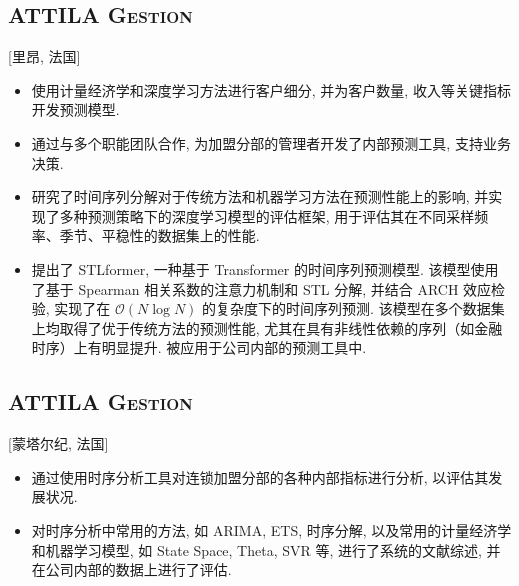 \documentclass{mycv}
\begin{document}
\vspace{-\parskip}

\subsection{\large \scshape ATTILA Gestion}[里昂, 法国]

\begin{positions}
\end{positions}

\begin{itemize}
  \itemsep 0em
  \item 使用计量经济学和深度学习方法进行客户细分, 并为客户数量, 收入等关键指标开发预测模型.
  \item 通过与多个职能团队合作, 为加盟分部的管理者开发了内部预测工具, 支持业务决策.
  \item 研究了时间序列分解对于传统方法和机器学习方法在预测性能上的影响, 并实现了多种预测策略下的深度学习模型的评估框架, 用于评估其在不同采样频率、季节、平稳性的数据集上的性能.
  \item 提出了 STLformer, 一种基于 Transformer 的时间序列预测模型. 该模型使用了基于 Spearman 相关系数的注意力机制和 STL 分解, 并结合 ARCH 效应检验, 实现了在 $\mathcal{O}(N \log{N})$ 的复杂度下的时间序列预测. 该模型在多个数据集上均取得了优于传统方法的预测性能, 尤其在具有非线性依赖的序列（如金融时序）上有明显提升. 被应用于公司内部的预测工具中.
\end{itemize}

\vspace{-\parskip}

\subsection{\large \scshape ATTILA Gestion}[蒙塔尔纪, 法国]

\begin{positions}
\end{positions}

\begin{itemize}
  \itemsep 0em
  \item 通过使用时序分析工具对连锁加盟分部的各种内部指标进行分析, 以评估其发展状况.
  \item 对时序分析中常用的方法, 如 ARIMA, ETS, 时序分解, 以及常用的计量经济学和机器学习模型, 如 State Space, Theta, SVR 等, 进行了系统的文献综述, 并在公司内部的数据上进行了评估.
\end{itemize}
\end{document}
